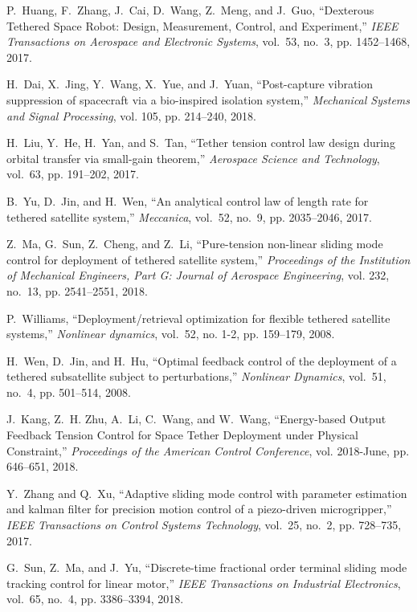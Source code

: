 \documentclass[10pt,onecolumn,draftcls]{IEEEtran}
\begin{document}
\begin{thebibliography}{10}
	P.~Huang, F.~Zhang, J.~Cai, D.~Wang, Z.~Meng, and J.~Guo, ``{Dexterous Tethered
		Space Robot: Design, Measurement, Control, and Experiment},'' \emph{IEEE
		Transactions on Aerospace and Electronic Systems}, vol.~53, no.~3, pp.
		1452--1468, 2017.
	
	H.~Dai, X.~Jing, Y.~Wang, X.~Yue, and J.~Yuan, ``Post-capture vibration
		suppression of spacecraft via a bio-inspired isolation system,''
		\emph{Mechanical Systems and Signal Processing}, vol. 105, pp. 214--240,
		2018.
	
	H.~Liu, Y.~He, H.~Yan, and S.~Tan, ``Tether tension control law design during
		orbital transfer via small-gain theorem,'' \emph{Aerospace Science and
		Technology}, vol.~63, pp. 191--202, 2017.
	
	B.~Yu, D.~Jin, and H.~Wen, ``An analytical control law of length rate for
		tethered satellite system,'' \emph{Meccanica}, vol.~52, no.~9, pp.
		2035--2046, 2017.
	
	Z.~Ma, G.~Sun, Z.~Cheng, and Z.~Li, ``Pure-tension non-linear sliding mode
		control for deployment of tethered satellite system,'' \emph{Proceedings of
		the Institution of Mechanical Engineers, Part G: Journal of Aerospace
		Engineering}, vol. 232, no.~13, pp. 2541--2551, 2018.
	
	P.~Williams, ``Deployment/retrieval optimization for flexible tethered
		satellite systems,'' \emph{Nonlinear dynamics}, vol.~52, no. 1-2, pp.
		159--179, 2008.
	
	H.~Wen, D.~Jin, and H.~Hu, ``Optimal feedback control of the deployment of a
		tethered subsatellite subject to perturbations,'' \emph{Nonlinear Dynamics},
		vol.~51, no.~4, pp. 501--514, 2008.
	
	J.~Kang, Z.~H. Zhu, A.~Li, C.~Wang, and W.~Wang, ``{Energy-based Output
		Feedback Tension Control for Space Tether Deployment under Physical
		Constraint},'' \emph{Proceedings of the American Control Conference}, vol.
		2018-June, pp. 646--651, 2018.
	
	Y.~Zhang and Q.~Xu, ``Adaptive sliding mode control with parameter estimation
		and kalman filter for precision motion control of a piezo-driven
		microgripper,'' \emph{IEEE Transactions on Control Systems Technology},
		vol.~25, no.~2, pp. 728--735, 2017.
	
	G.~Sun, Z.~Ma, and J.~Yu, ``Discrete-time fractional order terminal sliding
		mode tracking control for linear motor,'' \emph{IEEE Transactions on
		Industrial Electronics}, vol.~65, no.~4, pp. 3386--3394, 2018.
	

\end{thebibliography}
\end{document}
